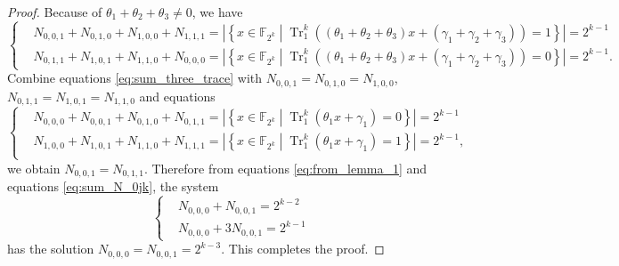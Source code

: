 \documentclass{article}
\newcommand{\F}{\mathbb{F}}
\newcommand{\0}{\textbf{0}}
\newcommand{\1}{\textbf{1}}
\newcommand{\TRACE}{\operatorname{Tr}_1^k}
\theoremstyle{plain}
\theoremstyle{nonumberplain}
\begin{document}
\begin{proof}
        Because of $ \theta_1+\theta_2+\theta_3\ne 0 $, we have 
        \begin{equation}\label{eq:sum_three_trace} \left\{\begin{alignedat}{2}
            &N_{0,0,1}+N_{0,1,0}+N_{1,0,0}+N_{1,1,1}=\left\lvert\left\{x\in\F_{2^k}\middle|\TRACE\left(\left(\theta_1+\theta_2+\theta_3\right)x+\left(\gamma_1+\gamma_2+\gamma_3\right)\right)=1\right\}\right\rvert=2^{k-1}\\
            &N_{0,1,1}+N_{1,0,1}+N_{1,1,0}+N_{0,0,0}=\left\lvert\left\{x\in\F_{2^k}\middle|\TRACE\left(\left(\theta_1+\theta_2+\theta_3\right)x+\left(\gamma_1+\gamma_2+\gamma_3\right)\right)=0\right\}\right\rvert=2^{k-1}.
        \end{alignedat}\right.\end{equation}
        Combine equations \eqref{eq:sum_three_trace} with $ N_{0,0,1}=N_{0,1,0}=N_{1,0,0} $, $ N_{0,1,1}=N_{1,0,1}=N_{1,1,0} $ and equations  
        \begin{equation}\label{eq:sum_N_0jk}\left\{\begin{alignedat}{2}
            &N_{0,0,0}+N_{0,0,1}+N_{0,1,0}+N_{0,1,1}=\left\lvert\left\{x\in\F_{2^k}\middle|\TRACE\left(\theta_1x+\gamma_1\right)=0\right\}\right\rvert=2^{k-1}\\
            &N_{1,0,0}+N_{1,0,1}+N_{1,1,0}+N_{1,1,1}=\left\lvert\left\{x\in\F_{2^k}\middle|\TRACE\left(\theta_1x+\gamma_1\right)=1\right\}\right\rvert=2^{k-1},\\
        \end{alignedat}\right.\end{equation}
        we obtain $ N_{0,0,1}=N_{0,1,1} $. 
        Therefore from equations \eqref{eq:from_lemma_1} and equations \eqref{eq:sum_N_0jk}, the system 
        \begin{equation}\left\{\begin{alignedat}{2}
            &N_{0,0,0}+N_{0,0,1}=2^{k-2}\\
            &N_{0,0,0}+3N_{0,0,1}=2^{k-1} 
        \end{alignedat}\right.\end{equation}
        has the solution $ N_{0,0,0}=N_{0,0,1}=2^{k-3} $. This completes the proof.
    \end{proof}
\end{document}
